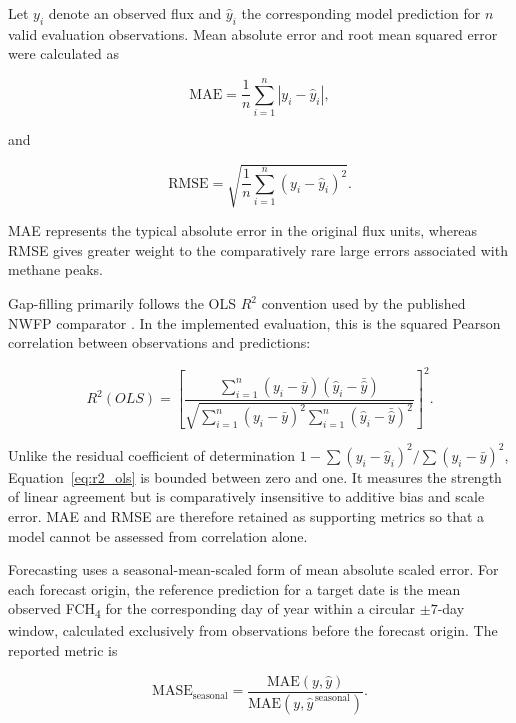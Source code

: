 Let \(y_i\) denote an observed flux and \(\hat{y}_i\) the corresponding model
prediction for \(n\) valid evaluation observations. Mean absolute error and
root mean squared error were calculated as

\begin{equation}
\mathrm{MAE}
=
\frac{1}{n}
\sum_{i=1}^{n}
\left|y_i-\hat{y}_i\right|,
\end{equation}

and

\begin{equation}
\mathrm{RMSE}
=
\sqrt{
\frac{1}{n}
\sum_{i=1}^{n}
\left(y_i-\hat{y}_i\right)^2
}.
\end{equation}

MAE represents the typical absolute error in the original flux units, whereas
RMSE gives greater weight to the comparatively rare large errors associated
with methane peaks.

Gap-filling primarily follows the OLS \(R^2\) convention used by the published
NWFP comparator \cite{zhu2023a}. In the implemented evaluation, this is the
squared Pearson correlation between observations and predictions:

\begin{equation}
R^2 (OLS)
=
\left[
\frac{
\sum_{i=1}^{n}
(y_i-\bar{y})
(\hat{y}_i-\bar{\hat{y}})
}{
\sqrt{
\sum_{i=1}^{n}(y_i-\bar{y})^2
\sum_{i=1}^{n}(\hat{y}_i-\bar{\hat{y}})^2
}
}
\right]^2.
\label{eq:r2_ols}
\end{equation}

Unlike the residual coefficient of determination
\(1-\sum(y_i-\hat{y}_i)^2/\sum(y_i-\bar{y})^2\),
Equation~\ref{eq:r2_ols} is bounded between zero and one. It measures the
strength of linear agreement but is comparatively insensitive to additive
bias and scale error. MAE and RMSE are therefore retained as supporting
metrics so that a model cannot be assessed from correlation alone.

Forecasting uses a seasonal-mean-scaled form of mean absolute scaled error.
For each forecast origin, the reference prediction for a target date is the
mean observed FCH\textsubscript{4} for the corresponding day of year within a
circular \(\pm 7\)-day window, calculated exclusively from observations before
the forecast origin. The reported metric is

\begin{equation}
\mathrm{MASE}_{\mathrm{seasonal}}
=
\frac{
\mathrm{MAE}(y,\hat{y})
}{
\mathrm{MAE}(y,\hat{y}^{\,\mathrm{seasonal}})
}.
\label{eq:mase_seasonal}
\end{equation}

